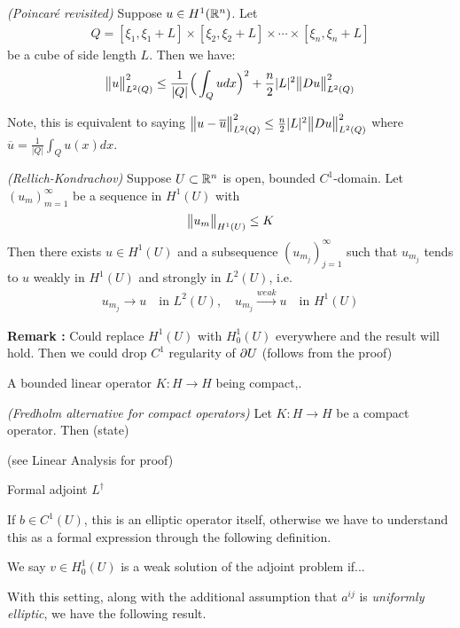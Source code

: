 \documentclass[10pt,a4paper]{report}
\begin{document}
\lem \emph{(Poincar\'{e} revisited)} Suppose $u\in H^1(\mathbb{R}^n)$. Let
\begin{align*}
Q = [\xi_1, \xi_1 +L] \times [\xi_2, \xi_2 +L] \times \cdots \times [\xi_n, \xi_n +L]
\end{align*}
be a cube of side length $L$. Then we have:
\begin{align*}
\bigl\lVert u\bigr\rVert_{L^2(Q)}^2 \leq \frac{1}{|Q|} \Big( \int_Q udx \Big)^2 + \frac{n}{2} |L|^2 \bigl\lVert Du\bigr\rVert_{L^2(Q)}^2
\end{align*}
\s

Note, this is equivalent to saying $\bigl\lVert u - \overline{u}\bigr\rVert_{L^2(Q)}^2 \leq \frac{n}{2} |L|^2 \bigl\lVert Du\bigr\rVert_{L^2(Q)}^2$ where $\overline{u} = \frac{1}{|Q|} \int_Q u(x) dx$.
\s

\thm \emph{(Rellich-Kondrachov)} Suppose $U \subset \mathbb{R}^n$ is open, bounded $C^1$-domain. Let $(u_m)_{m=1}^{\infty}$ be a sequence in $H^1(U)$ with
\begin{align*}
\bigl\lVert u_m\bigr\rVert_{H^1(U)} \leq K
\end{align*}
Then there exists $u\in H^1(U)$ and a subsequence $(u_{m_j})_{j=1}^{\infty}$ such that $u_{m_j}$ tends to $u$ weakly in $H^1(U)$ and strongly in $L^2(U)$, i.e.
\begin{align*}
u_{m_j} \rightarrow u \quad \text{in } L^2(U), \quad u_{m_j} \xrightarrow{weak} u \quad \text{in } H^1(U)
\end{align*}

\textbf{Remark :} Could replace $H^1(U)$ with $H_0^1(U)$ everywhere and the result will hold. Then we could drop $C^1$ regularity of $\partial U$ (follows from the proof)
\s

 A bounded linear operator $K:H\rightarrow H$ being compact,.
\s

\thm \emph{(Fredholm alternative for compact operators)} Let $K:H\rightarrow H$ be a compact operator. Then (state)

(see Linear Analysis for proof)
\s

Formal adjoint $L^{\dagger}$

\quad If $b\in C^1(U)$, this is an elliptic operator itself, otherwise we have to understand this as a formal expression through the following definition.
\s

 We say $v\in H_0^1(U)$ is a weak solution of the adjoint problem if...
\s

With this setting, along with the additional assumption that $a^{ij}$ is \emph{uniformly elliptic}, we have the following result. \s
\end{document}
